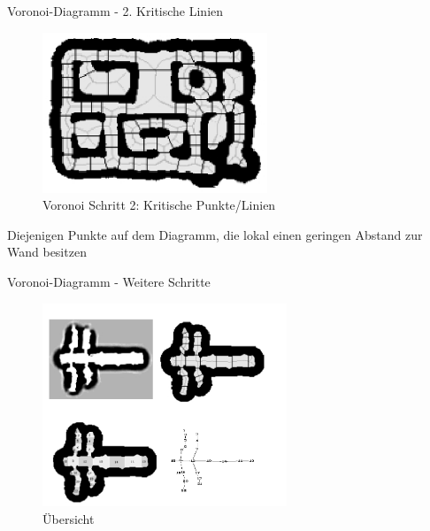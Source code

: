 \begin{frame}{Voronoi-Diagramm - 2. Kritische Linien}
\begin{figure}[h]
 \centering
 \includegraphics[width=0.6\textwidth]{./material/voronoi-step2.png}
 \caption{Voronoi Schritt 2: Kritische Punkte/Linien \cite{Thrun1998}}
\end{figure}
Diejenigen Punkte auf dem Diagramm, die lokal einen geringen Abstand zur Wand besitzen
  
\end{frame}

\begin{frame}{Voronoi-Diagramm - Weitere Schritte}
 \begin{figure}[h]
 \centering
 \includegraphics[width=0.65\textwidth]{./material/complete.png}
 \caption{Übersicht \cite{Thrun1998}}
 \label{fig:gesamt}
\end{figure}
 
\end{frame}

